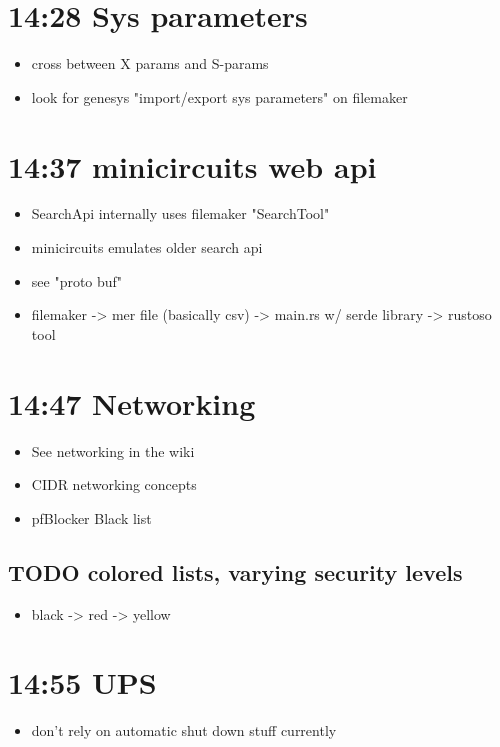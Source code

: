 \documentclass[11pt]{article}
\begin{document}
\section*{14:28 Sys parameters}
\label{sec:orgf2b02ff}
\begin{itemize}
\item cross between X params and S-params
\item look for genesys "import/export sys parameters" on filemaker
\end{itemize}

\section*{14:37 minicircuits web api}
\label{sec:org3c2e731}
\begin{itemize}
\item SearchApi internally uses filemaker "SearchTool"
\item minicircuits emulates older search api
\item see "proto buf"

\item filemaker -> mer file (basically csv) -> main.rs w/ serde library -> rustoso tool
\end{itemize}

\section*{14:47 Networking}
\label{sec:org2fcf006}
\begin{itemize}
\item See networking in the wiki
\item CIDR networking concepts
\item pfBlocker Black list
\end{itemize}
\subsection*{{\bfseries\sffamily TODO} colored lists, varying security levels}
\label{sec:org3ade6c0}
\begin{itemize}
\item black -> red -> yellow
\end{itemize}

\section*{14:55 UPS}
\label{sec:org07c5ff9}
\begin{itemize}
\item don't rely on automatic shut down stuff currently
\end{itemize}
\end{document}
